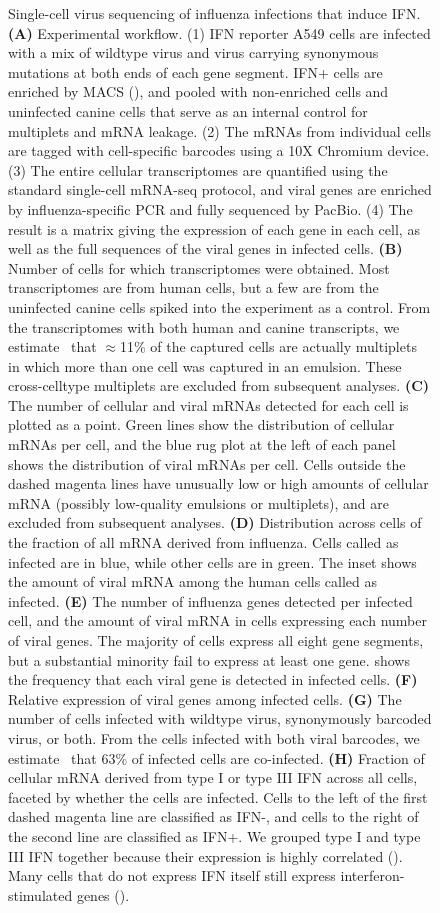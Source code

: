 \documentclass[9pt,lineno]{elife}
\begin{document}
\begin{figure}
\begin{fullwidth}
\caption{
Single-cell virus sequencing of influenza infections that induce IFN.
{\bf (A)} Experimental workflow.
(1) IFN reporter A549 cells are infected with a mix of wildtype virus and virus carrying synonymous mutations at both ends of each gene segment.
IFN+ cells are enriched by MACS (), and pooled with non-enriched cells and uninfected canine cells that serve as an internal control for multiplets and mRNA leakage.
(2) The mRNAs from individual cells are tagged with cell-specific barcodes using a 10X Chromium device.
(3) The entire cellular transcriptomes are quantified using the standard single-cell mRNA-seq protocol, and viral genes are enriched by influenza-specific PCR and fully sequenced by PacBio.
(4) The result is a matrix giving the expression of each gene in each cell, as well as the full sequences of the viral genes in infected cells.
{\bf (B)} Number of cells for which transcriptomes were obtained.
Most transcriptomes are from human cells, but a few are from the uninfected canine cells spiked into the experiment as a control.
From the transcriptomes with both human and canine transcripts, we estimate~\citep{bloom2018estimating} that $\approx$11\% of the captured cells are actually multiplets in which more than one cell was captured in an emulsion. 
These cross-celltype multiplets are excluded from subsequent analyses.
{\bf (C)} The number of cellular and viral mRNAs detected for each cell is plotted as a point.
Green lines show the distribution of cellular mRNAs per cell, and the blue rug plot at the left of each panel shows the distribution of viral mRNAs per cell.
Cells outside the dashed magenta lines have unusually low or high amounts of cellular mRNA (possibly low-quality emulsions or multiplets), and are excluded from subsequent analyses.
{\bf (D)} Distribution across cells of the fraction of all mRNA derived from influenza.
Cells called as infected are in blue, while other cells are in green.
The inset shows the amount of viral mRNA among the human cells called as infected.
{\bf (E)} The number of influenza genes detected per infected cell, and the amount of viral mRNA in cells expressing each number of viral genes.
The majority of cells express all eight gene segments, but a substantial minority fail to express at least one gene.
 shows the frequency that each viral gene is detected in infected cells.
{\bf (F)} Relative expression of viral genes among infected cells.
{\bf (G)} The number of cells infected with wildtype virus, synonymously barcoded virus, or both.
From the cells infected with both viral barcodes, we estimate~\citep{bloom2018estimating} that 63\% of infected cells are co-infected.
{\bf (H)} Fraction of cellular mRNA derived from type I or type III IFN across all cells, faceted by whether the cells are infected.
Cells to the left of the first dashed magenta line are classified as IFN-, and cells to the right of the second line are classified as IFN+.
We grouped type I and type III IFN together because their expression is highly correlated ().
Many cells that do not express IFN itself still express interferon-stimulated genes ().
}
\label{fig:experiment}


\end{fullwidth}
\end{figure}
\end{document}
